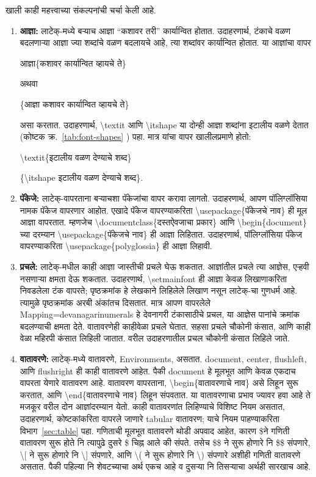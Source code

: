 \documentclass[11pt]{article}
\newcommand{\7}{\textbackslash}
\newcommand{\Syn}{\textenglish}
\begin{document}
खाली काही महत्त्वाच्या संकल्पनांची चर्चा केली आहे.
\begin{enumerate}[leftmargin=*]
\item\label{it:command} \textbf{आज्ञा:} लाटेक्-मध्ये बऱ्याच आज्ञा ``कशावर तरी'' कार्यान्वित
 होतात. उदाहरणार्थ, टंकाचे वळण बदलणाऱ्या आज्ञा ज्या शब्दांचे वळण बदलायचे आहे,
 त्या शब्दांवर कार्यान्वित होतात. या आज्ञांचा वापर
 \begin{center}
 आज्ञा\{कशावर कार्यान्वित व्हायचे ते\}

अथवा
 
 \{आज्ञा कशावर कार्यान्वित व्हायचे ते\}
 \end{center}
 असा करतात. उदाहरणार्थ, \Syn{\7textit} आणि \Syn{\7itshape } या दोन्ही
 आज्ञा शब्दांना इटालीय वळणे देतात (कोष्टक क्र.~\ref{tab:font-shapes} ) पहा. मात्र यांचा वापर
 खालीलप्रमाणे होतो:
 \begin{center}
 \Syn{\7textit}\{इटालीय वळण देण्याचे शब्द\}

 \{\Syn{\7itshape } इटालीय वळण देण्याचे शब्द\}.
 \end{center}
\item\label{it:usepackage}\textbf{पॅकेजे:} लाटेक्-वापरताना बऱ्याचशा पॅकेजांचा वापर करावा
 लागतो. उदाहरणार्थ, आपण पॉलिग्लॉसिया नामक पॅकेज वापरणार आहोत. एखादे पॅकेज
 वापरण्याकरिता \Syn{\7usepackage}\{पॅकेजचे नाव\} ही मूल आज्ञा
 वापरतात. म्हणजेच \Syn{\7documentclass}\{दस्तऐवजाचा प्रकार\}
 आणि \Syn{\7begin\{document\}}च्या दरम्यान \Syn{\7usepackage}\{पॅकेजचे
 नाव\} ही आज्ञा लिहितात. उदाहरणार्थ, पॉलिग्लॉसिया पॅकेज वापरण्याकरिता
 \Syn{\7usepackage\{polyglossia\}} ही आज्ञा लिहावी.
\item\label{it:parameter} \textbf{प्रचले:} लाटेक्-मधील काही आज्ञा जास्तीची प्रचले घेऊ
 शकतात. आज्ञांतील प्रचले त्या आज्ञेस, एऱ्हवी नसणाऱ्या क्षमता देऊ शकतात. उदाहरणार्थ, \Syn{\7setmainfont} ही आज्ञा केवळ लिखाणाकरिता निवडलेला टंक वापरते; पृष्ठक्रमांक हे लेखकाने लिहिलेले लिखाण नसून लाटेक्-चा गुणधर्म आहे. त्यामुळे पृष्ठक्रमांक अरबी अंकांतच दिसतात. मात्र आपण वापरलेले \Syn{Mapping=devanagarinumerals} हे देवनागरी टंकासाठीचे प्रचल, या आज्ञेस पानांचे क्रमांक बदलण्याची क्षमता देते. वातावरणेही काहीवेळा प्रचले घेतात. सहसा प्रचले चौकोनी कंसात, आणि काही वेळा महिरपी कंसात लिहिली जातात. वरील उदाहरणातील प्रचल चौकोनी कंसात लिहिले जाते.
 \item \label{it:env}\textbf{वातावरणे:} लाटेक्-मध्ये वातावरणे,
 \Syn{Environments}, असतात. \Syn{document, center, flushleft,} आणि
 \Syn{flushright} ही काही वातावरणे आहेत. पैकी \Syn{document} हे मूलभूत
 आणि केवळ एकदाच वापरता येणारे वातावरण आहे. वातावरण वापरताना,
 \Syn{\7begin}\{वातावरणाचे नाव\} असे लिहून सुरू करतात, आणि
 \Syn{\7end}\{वातावरणाचे नाव\} लिहून संपवतात. या वातावरणाचा प्रभाव
 ज्यावर हवा आहे ते मजकूर वरील दोन आज्ञांदरम्यान येतो. काही वातावरणांत
 लिहिण्याचे विशिष्ट नियम असतात, उदाहरणार्थ, कोष्टकांकरिता वापरले जाणारे
 \Syn{tabular} वातावरण; याचे नियम पाहण्याकरिता विभाग~\ref{sec:table}
 पहा. 
 गणिताची मूलभूत
 वातावरणे थोडी अपवाद आहेत, कारण \$ने गणिती वातावरण सुरू होते नि त्यापुढे दुसरे \$ चिह्न आले की संपते. तसेच \$\$ ने सुरू होणारे नि \$\$ संपणारे, \7[ ने सुरू होणारे नि \7] संपणारे, आणि \7( ने सुरू होणारे नि \7) संपणारे अशीही गणिती वातावरणे असतात. पैकी पहिल्या नि शेवटच्याचा अर्थ एकच आहे व दुसऱ्या नि तिसऱ्याचा अर्थही सारखाच आहे.

\end{enumerate}
\end{document}
